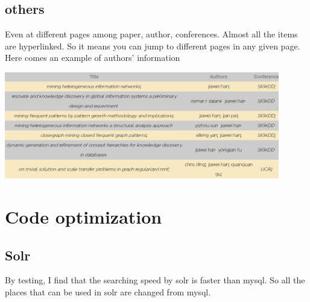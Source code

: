 \documentclass[10pt,twoside,a4paper,titlepage]{article}
\begin{document}
\subsection{others}
Even at different pages among paper, author, conferences. Almost all the items are hyperlinked. So it means you can jump to different pages in any given page. Here comes an example of authors' information\par
\includegraphics[width=0.9\textwidth]{jaf/author.PNG}\par

\section{Code optimization}
\subsection{Solr}
By testing, I find that the searching speed by solr is faster than mysql. So all the places that can be used in solr are changed from mysql.\par
\end{document}
